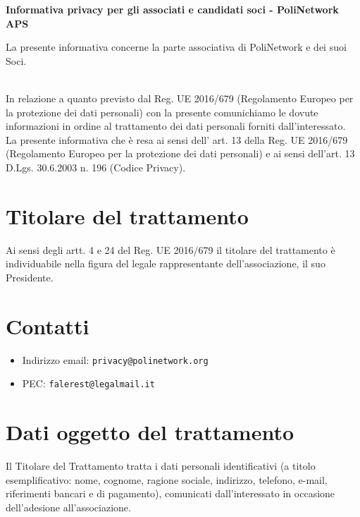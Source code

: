\documentclass[legalpaper, 11pt]{exam}
\begin{document}

{


\begin{center}
{\textbf{Informativa privacy per gli associati e candidati soci - PoliNetwork APS}}

\end{center}

\vspace{1pt}

\noindent
La presente informativa concerne la parte associativa di PoliNetwork e dei suoi Soci.

\vspace{10pt}
~\\
\noindent
In relazione a quanto previsto dal Reg. UE 2016/679 (Regolamento Europeo per la protezione dei dati personali) con la presente comunichiamo le dovute informazioni in ordine al trattamento dei dati personali forniti dall’interessato.
\\
La presente informativa che è resa ai sensi dell’ art. 13 della Reg. UE 2016/679 (Regolamento Europeo per la protezione dei dati personali) e ai sensi dell’art. 13 D.Lgs. 30.6.2003 n. 196 (Codice Privacy).


\section{Titolare del trattamento}
Ai sensi degli artt. 4 e 24 del Reg. UE 2016/679 il titolare del trattamento è individuabile nella figura del legale rappresentante dell'associazione, il suo Presidente.

\section{Contatti}
\begin{itemize}
	\item Indirizzo email: \texttt{privacy@polinetwork.org}
	\item PEC: \texttt{falerest@legalmail.it}
\end{itemize}


\section{Dati oggetto del trattamento}
Il Titolare del Trattamento tratta i dati personali identificativi (a titolo esemplificativo: nome, cognome, ragione sociale, indirizzo, telefono, e-mail, riferimenti bancari e di pagamento), comunicati dall’interessato in occasione dell’adesione all’associazione.

}
\end{document}
